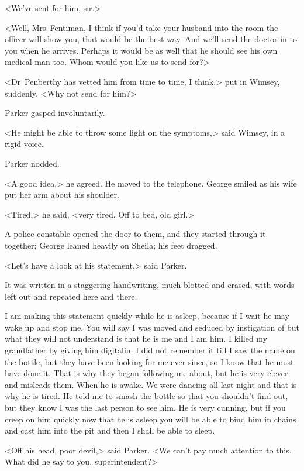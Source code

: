 <We've sent for him, sir.>

<Well, Mrs~Fentiman, I think if you'd take your husband into the room the officer will show you, that would be the best way. And we'll send the doctor in to you when he arrives. Perhaps it would be as well that he should see his own medical man too. Whom would you like us to send for?>

<Dr~Penberthy has vetted him from time to time, I think,> put in Wimsey, suddenly. <Why not send for him?>

Parker gasped involuntarily.

<He might be able to throw some light on the symptoms,> said Wimsey, in a rigid voice.

Parker nodded.

<A good idea,> he agreed. He moved to the telephone. George smiled as his wife put her arm about his shoulder.

<Tired,> he said, <very tired. Off to bed, old girl.>

A police-constable opened the door to them, and they started through it together; George leaned heavily on Sheila; his feet dragged.

<Let's have a look at his statement,> said Parker.

It was written in a staggering handwriting, much blotted and erased, with words left out and repeated here and there.

\begin{mail}{}{}
\noindent I am making this statement quickly while he is asleep, because if I wait he may wake up and stop me. You will say I was moved and seduced by instigation of but what they will not understand is that he is me and I am him. I killed my grandfather by giving him digitalin. I did not remember it till I saw the name on the bottle, but they have been looking for me ever since, so I know that he must have done it. That is why they began following me about, but he is very clever and misleads them. When he is awake. We were dancing all last night and that is why he is tired. He told me to smash the bottle so that you shouldn't find out, but they know I was the last person to see him. He is very cunning, but if you creep on him quickly now that he is asleep you will be able to bind him in chains and cast him into the pit and then I shall be able to sleep.

\end{mail}


<Off his head, poor devil,> said Parker. <We can't pay much attention to this. What did he say to you, superintendent?>

